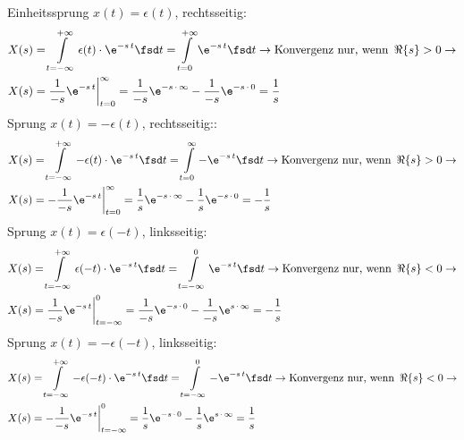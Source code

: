 \begin{ExCalc}
Einheitssprung $x(t)=\epsilon(t)$, rechtsseitig:
\begin{align}
  &X(s) = \int\limits_{t=-\infty}^{+\infty} \epsilon(t) \cdot \e^{-s\,t} \fsd t
  = \int\limits_{t=0}^{+\infty} \e^{-s\,t} \fsd t
  \rightarrow \text{Konvergenz nur, wenn}\,\,\,\Re\{s\}>0
  \rightarrow\\
  &X(s) = \frac{1}{-s}\e^{-s\,t}\bigg|_{t=0}^{\infty}
  = \frac{1}{-s}\e^{-s \,\cdot\, \infty} - \frac{1}{-s}\e^{-s\,\cdot\, 0} = \frac{1}{s}
\end{align}
%
Sprung $x(t)=-\epsilon(t)$, rechtsseitig::
\begin{align}
  &X(s) = \int\limits_{t=-\infty}^{+\infty} -\epsilon(t) \cdot \e^{-s\,t} \fsd t
  = \int\limits_{t=0}^{\infty} - \e^{-s\,t} \fsd t
  \rightarrow \text{Konvergenz nur, wenn}\,\,\,\Re\{s\}>0
  \rightarrow\\
  &X(s) = -\frac{1}{-s}\e^{-s\,t}\bigg|_{t=0}^{\infty}
  = \frac{1}{s}\e^{-s\,\cdot\, \infty} - \frac{1}{s}\e^{-s\,\cdot\, 0} = -\frac{1}{s}
\end{align}
%
Sprung $x(t)=\epsilon(-t)$, linksseitig:
\begin{align}
  &X(s) = \int\limits_{t=-\infty}^{+\infty} \epsilon(-t) \cdot \e^{-s\,t} \fsd t
  = \int\limits_{t=-\infty}^{0} \e^{-s\,t} \fsd t
  \rightarrow \text{Konvergenz nur, wenn}\,\,\,\Re\{s\}<0
  \rightarrow\\
  &X(s) = \frac{1}{-s}\e^{-s\,t}\bigg|_{t=-\infty}^{0}
  = \frac{1}{-s}\e^{-s\,\cdot\, 0} - \frac{1}{-s}\e^{s\,\cdot\, \infty} = -\frac{1}{s}
\end{align}
%
Sprung $x(t)=-\epsilon(-t)$, linksseitig:
\begin{align}
  &X(s) = \int\limits_{t=-\infty}^{+\infty} -\epsilon(-t) \cdot \e^{-s\,t} \fsd t
  = \int\limits_{t=-\infty}^{0} - \e^{-s\,t} \fsd t
  \rightarrow \text{Konvergenz nur, wenn}\,\,\,\Re\{s\}<0
  \rightarrow\\
  &X(s) = -\frac{1}{-s}\e^{-s\,t}\bigg|_{t=-\infty}^{0}
  = \frac{1}{s}\e^{-s \, \cdot \, 0} - \frac{1}{s}\e^{s \, \cdot \, \infty} = \frac{1}{s}
\end{align}
\end{ExCalc}
